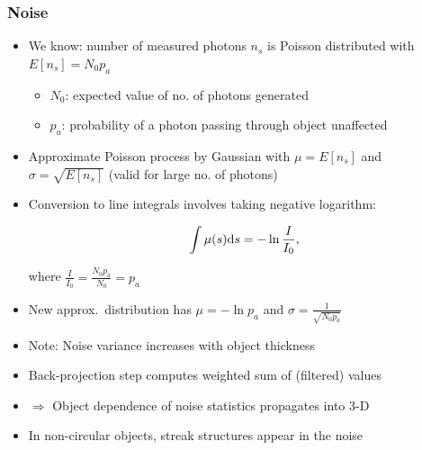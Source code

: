 \begin{frame}[allowframebreaks]
	\frametitle{Noise}

	\begin{itemize}
		\item We know: number of measured photons $n_s$ is Poisson distributed with
		      $E[n_s] = N_0 p_a$
		      \begin{itemize}
			      \item $N_0$: expected value of no. of photons generated
			      \item $p_a$: probability of a photon passing through object unaffected
		      \end{itemize}
		\item Approximate Poisson process by Gaussian with $\mu = E[n_s]$ and $\sigma = \sqrt{E[n_s]}$ (valid for large no. of photons)

		\item Conversion to line integrals involves taking negative logarithm:

		      \begin{equation}
			      \int \mu(s) \textnormal ds = -\ln\frac{I}{I_0},
		      \end{equation}

		      where $\frac{I}{I_0} = \frac{N_0 p_a}{N_0} = p_a$
		\item New approx.~distribution has $\mu = -\ln p_a$ and $\sigma = \frac{1}{\sqrt{N_0 p_a}}$
		\item Note: Noise variance increases with object thickness

		\item Back-projection step computes weighted sum of (filtered) values
		\item[ ] $\Rightarrow$ Object dependence of noise statistics propagates into 3-D
		\item In non-circular objects, streak structures appear in the noise
	\end{itemize}


\end{frame}
